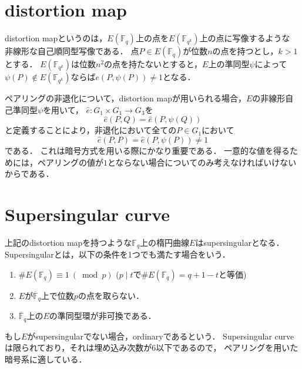 \section{distortion map}
\par

distortion mapというのは，$E(\mathbb{F} _q)$上の点を$E(\mathbb{F} _{q ^k})$上の点に写像するような
非線形な自己順同型写像である．
点$P \in E(\mathbb{F} _q)$が位数$n$の点を持つとし，$k > 1$とする．
$E(\mathbb{F} _{q ^k})$は位数$n ^2$の点を持たないとすると，$E$上の準同型$\psi$によって
$\psi(P) \notin E(\mathbb{F} _{q ^k})$ならば$e(P, \psi(P)) \not= 1$となる．
\par
ペアリングの非退化について，distortion mapが用いられる場合，$E$の非線形自己準同型$\psi$を用いて，
$\hat{e} : G _1 \times G _1 \to G _3$を
\[
\hat{e}(P, Q) = \hat{e}(P, \psi(Q))
\]
と定義することにより，非退化において全ての$P \in G _1$において
\[
\hat{e}(P, P) = \hat{e}(P, \psi(P)) \not= 1
\]
である．
これは暗号方式を用いる際にかなり重要である．
一意的な値を得るためには，ペアリングの値が$1$とならない場合についてのみ考えなければいけないからである．\\
\par
\section{Supersingular curve}
\par
上記のdistortion mapを持つような$\mathbb{F} _q$上の楕円曲線$E$はsupersingularとなる．
Supersingularとは，以下の条件を1つでも満たす場合をいう．
\begin{enumerate}
  \item $\# E(\mathbb{F} _q) \equiv 1 \ (\bmod p)$
        ($p \mid t$で$\# E(\mathbb{F} _q) = q + 1 - t$と等価)
  \item $E$が$\overline{\mathbb{F}} _q$上で位数$p$の点を取らない．
  \item $\overline{\mathbb{F}} _q$上の$E$の準同型環が非可換である．
\end{enumerate}
もし$E$がsupersingularでない場合，ordinaryであるという．
Supersingular curveは限られており，それは埋め込み次数が$6$以下であるので，
ペアリングを用いた暗号系に適している．\\
